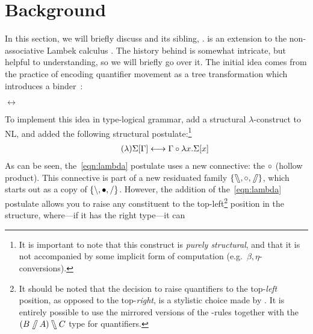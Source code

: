 \documentclass[10pt,a4paper]{llncs}
\begin{document}
\section{Background}
In this section, we will briefly discuss {\NLCL} and its sibling,
{\NLLAM}. {\NLCL} is an extension to the non-associative Lambek
calculus \citep[NL;][]{lambek1961}.
The history behind {\NLCL} is somewhat intricate, but helpful to
understanding, so we will briefly go over it.
The initial idea comes from the practice of encoding quantifier
movement as a tree transformation which introduces a
binder~\citep{heim1998}:
\begin{center}
  \begin{minipage}{0.4\linewidth}\centering
  \end{minipage}%
  \begin{minipage}{0.05\linewidth}\centering
    $\longleftrightarrow$
  \end{minipage}%
  \begin{minipage}{0.5\linewidth}\centering
  \end{minipage}
\end{center}
To implement this idea in type-logical grammar,
\citeauthor{barker2015} add a structural $\lambda$-construct to NL,
and added the following structural postulate:\footnote{%
  It is important to note that this construct is \emph{purely
  structural}, and that it is not accompanied by some implicit form of
  computation (e.g.\ $\beta,\eta$-conversions).
}
\begin{align}
  \tag{$\lambda$}
  \Sigma[\Gamma] \longleftrightarrow \Gamma\mathbin{\circ}\lambda{x}.\Sigma[x]
  \label{eqn:lambda}
\end{align}
As can be seen, the~\eqref{eqn:lambda} postulate uses a new
connective: the $\mathbin{\circ}$ (hollow product).
This connective is part of a new residuated family $\{\fatbslash, \mathbin{\circ},
\mathbin{\!\fatslash\,}\}$, which starts out as a copy of $\{\mathbin{\backslash}, \bullet,
\mathbin{\slash}\}$.
However, the addition of the~\eqref{eqn:lambda} postulate allows you
to raise any constituent to the top-left\footnote{%
  It should be noted that the decision to raise quantifiers to the
  top-\emph{left} position, as opposed to the top-\emph{right}, is a
  stylistic choice made by \citet{barker2015}.
  It is entirely possible to use the mirrored versions of the
  \I\B\C-rules together with the ${(B\mathbin{\!\fatslash\,} A)\fatbslash C}$ type for
  quantifiers.
} position in the structure, where---if it has the right type---it can
\end{document}
